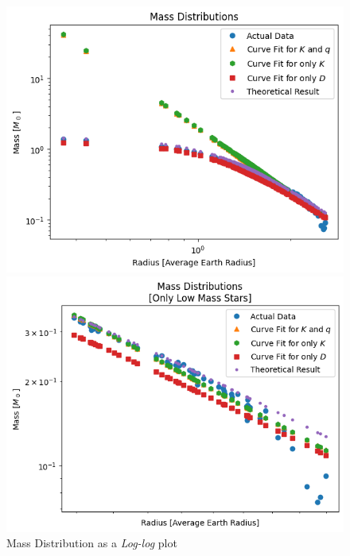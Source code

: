\documentclass[letterpaper,12pt]{article}
\begin{document}
\begin{figure}[H]
\begin{minipage}{.5\textwidth}
\centerline{\includegraphics[width=\linewidth]{figures/appendix/2_1_7_n_ll_ms_r.png}}
\end{minipage}
\begin{minipage}{.5\textwidth}
\centerline{\includegraphics[width=\linewidth]{figures/appendix/2_1_8_n_ll_ms_r_.png}}
\end{minipage}
\caption{Mass Distribution as a \textit{Log-log} plot}
\end{figure}
\end{document}

